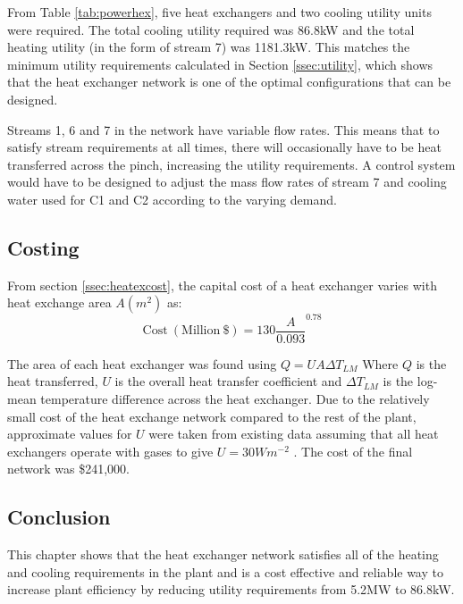 From Table \ref{tab:powerhex}, five heat exchangers and two cooling utility units were required. The total cooling utility required was 86.8kW and the total heating utility (in the form of stream 7) was 1181.3kW. This matches the minimum utility requirements calculated in Section \ref{ssec:utility}, which shows that the heat exchanger network is one of the optimal configurations that can be designed.

Streams 1, 6 and 7 in the network have variable flow rates. This means that to satisfy stream requirements at all times, there will occasionally have to be heat transferred across the pinch, increasing the utility requirements. A control system would have to be designed to adjust the mass flow rates of stream 7 and cooling water used for C1 and C2 according to the varying demand.

\subsection{Costing}
From section \ref{ssec:heatexcost}, the capital cost of a heat exchanger varies with heat exchange area $A (m^2)$ as:
\setlength{\belowdisplayskip}{1pt} \setlength{\belowdisplayshortskip}{1pt}
\setlength{\abovedisplayskip}{1pt} \setlength{\abovedisplayshortskip}{1pt}
\begin{equation} 
\mathrm{Cost \ (Million\ \$)} = 130 \frac{A}{0.093}^{0.78}
\end{equation}

The area of each heat exchanger was found using $Q = UA\Delta T_{LM}$
Where $Q$ is the heat transferred, $U$ is the overall heat transfer coefficient and $\Delta T_{LM}$ is the log-mean temperature difference across the heat exchanger. Due to the relatively small cost of the heat exchange network compared to the rest of the plant, approximate values for $U$ were taken from existing data assuming that all heat exchangers operate with gases to give $U=30Wm^{-2}$ \cite{hexcoeff}. The cost of the final network was \$241,000. 

\subsection{Conclusion}
This chapter shows that the heat exchanger network satisfies all of the heating and cooling requirements in the plant and is a cost effective and reliable way to increase plant efficiency by reducing utility requirements from 5.2MW to 86.8kW.


%

%
